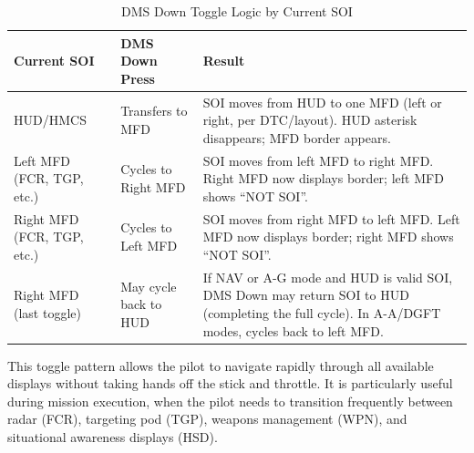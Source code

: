 \documentclass[11pt,a4paper]{article}
\begin{document}
\begin{table}[ht]

\centering

\small

\renewcommand{\arraystretch}{1.3}

\caption{DMS Down Toggle Logic by Current SOI}

\label{tab:C4-S2-DMS-Down-Logic}

\begin{tabularx}{15.6cm}{L{3.2cm} L{5.0cm} L{6.8cm}}


\textbf{\color{white}Current SOI} & \textbf{\color{white}DMS Down Press} & \textbf{\color{white}Result} \\

\midrule

HUD/HMCS & Transfers to MFD & SOI moves from HUD to one MFD (left or right, per DTC/layout). HUD asterisk disappears; MFD border appears. \\

\midrule

Left MFD (FCR, TGP, etc.) & Cycles to Right MFD & SOI moves from left MFD to right MFD. Right MFD now displays border; left MFD shows ``NOT SOI''. \\

\midrule

Right MFD (FCR, TGP, etc.) & Cycles to Left MFD & SOI moves from right MFD to left MFD. Left MFD now displays border; right MFD shows ``NOT SOI''. \\

\midrule

Right MFD (last toggle) & May cycle back to HUD & If NAV or A-G mode and HUD is valid SOI, DMS Down may return SOI to HUD (completing the full cycle). In A-A/DGFT modes, cycles back to left MFD. \\

\bottomrule

\end{tabularx}

\end{table}

This toggle pattern allows the pilot to navigate rapidly through all available displays without taking hands off the stick and throttle. It is particularly useful during mission execution, when the pilot needs to transition frequently between radar (FCR), targeting pod (TGP), weapons management (WPN), and situational awareness displays (HSD).
\end{document}

